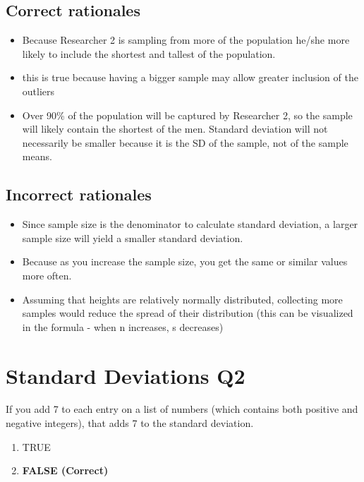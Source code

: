 \documentclass[letterpaper,9pt,twoside,printwatermark=false]{pinp}
\providecommand{\tightlist}{%
  \setlength{\itemsep}{0pt}\setlength{\parskip}{0pt}}
\begin{document}
\subsection{Correct rationales}\label{correct-rationales-3}

\begin{itemize}
\tightlist
\item
  Because Researcher 2 is sampling from more of the population he/she
  more likely to include the shortest and tallest of the population.
\item
  this is true because having a bigger sample may allow greater
  inclusion of the outliers
\item
  Over 90\% of the population will be captured by Researcher 2, so the
  sample will likely contain the shortest of the men. Standard deviation
  will not necessarily be smaller because it is the SD of the sample,
  not of the sample means.
\end{itemize}

\subsection{Incorrect rationales}\label{incorrect-rationales-3}

\begin{itemize}
\tightlist
\item
  Since sample size is the denominator to calculate standard deviation,
  a larger sample size will yield a smaller standard deviation.
\item
  Because as you increase the sample size, you get the same or similar
  values more often.
\item
  Assuming that heights are relatively normally distributed, collecting
  more samples would reduce the spread of their distribution (this can
  be visualized in the formula - when n increases, s decreases)
\end{itemize}

\section{Standard Deviations Q2}\label{standard-deviations-q2}

If you add 7 to each entry on a list of numbers (which contains both
positive and negative integers), that adds 7 to the standard deviation.

\begin{enumerate}
\def\labelenumi{\alph{enumi})}
\tightlist
\item
  TRUE
\item
  \textbf{FALSE (Correct)}
\end{enumerate}
\end{document}
